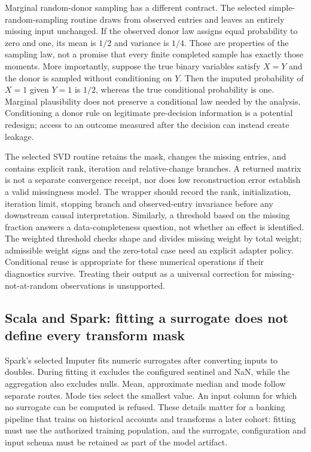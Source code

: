 Marginal random-donor sampling has a different contract. The selected simple-random-sampling routine draws from observed entries and leaves an entirely missing input unchanged. If the observed donor law assigns equal probability to zero and one, its mean is $1/2$ and variance is $1/4$. Those are properties of the sampling law, not a promise that every finite completed sample has exactly those moments. More importantly, suppose the true binary variables satisfy $X=Y$ and the donor is sampled without conditioning on $Y$. Then the imputed probability of $X=1$ given $Y=1$ is $1/2$, whereas the true conditional probability is one. Marginal plausibility does not preserve a conditional law needed by the analysis. Conditioning a donor rule on legitimate pre-decision information is a potential redesign; access to an outcome measured after the decision can instead create leakage.\citep{exec25_otm_imputejl,exec25_otm_choice}

The selected SVD routine retains the mask, changes the missing entries, and contains explicit rank, iteration and relative-change branches. A returned matrix is not a separate convergence receipt, nor does low reconstruction error establish a valid missingness model. The wrapper should record the rank, initialization, iteration limit, stopping branch and observed-entry invariance before any downstream causal interpretation. Similarly, a threshold based on the missing fraction answers a data-completeness question, not whether an effect is identified. The weighted threshold checks shape and divides missing weight by total weight; admissible weight signs and the zero-total case need an explicit adapter policy. Conditional reuse is appropriate for these numerical operations if their diagnostics survive. Treating their output as a universal correction for missing-not-at-random observations is unsupported.\citep{exec25_otm_imputejl,exec25_otm_choice}

\subsection{Scala and Spark: fitting a surrogate does not define every transform mask}

Spark's selected Imputer fits numeric surrogates after converting inputs to doubles. During fitting it excludes the configured sentinel and NaN, while the aggregation also excludes nulls. Mean, approximate median and mode follow separate routes. Mode ties select the smallest value. An input column for which no surrogate can be computed is refused. These details matter for a banking pipeline that trains on historical accounts and transforms a later cohort: fitting must use the authorized training population, and the surrogate, configuration and input schema must be retained as part of the model artifact.\citep{exec25_otm_spark}

